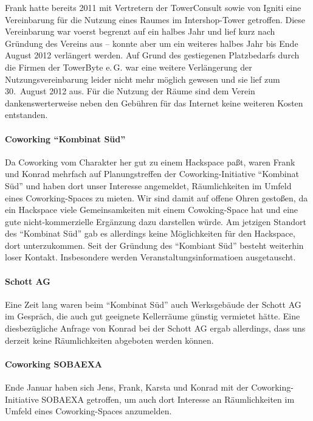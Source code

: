 \documentclass[10pt,DIV16]{scrartcl}
\begin{document}
Frank hatte bereits 2011 mit Vertretern der TowerConsult sowie
von Igniti eine Vereinbarung für die Nutzung eines Raumes im 
Intershop-Tower getroffen. Diese Vereinbarung war voerst begrenzt 
auf ein halbes Jahr und lief kurz nach Gründung des Vereins aus -- 
konnte aber um ein weiteres halbes Jahr bis Ende August 2012 
verlängert werden. Auf Grund des gestiegenen Platzbedarfs durch die
Firmen der TowerByte e.\,G. war eine weitere Verlängerung der
Nutzungsvereinbarung leider nicht mehr möglich gewesen und sie
lief zum 30.~August 2012 aus. Für die Nutzung der Räume sind dem
Verein dankenswerterweise neben den Gebühren für das Internet keine
weiteren Kosten entstanden.

\paragraph{Coworking ``Kombinat Süd''}

Da Coworking vom Charakter her gut zu einem Hackspace paßt, waren 
Frank und Konrad mehrfach auf Planungstreffen der 
Coworking-Initiative "`Kombinat Süd"' und haben dort unser Interesse 
angemeldet, Räumlichkeiten im Umfeld eines Coworking-Spaces zu 
mieten.  Wir sind damit auf offene Ohren gestoßen, da ein Hackspace 
viele Gemeinsamkeiten mit einem Cowoking-Space hat und eine gute 
nicht-kommerzielle Ergänzung dazu darstellen würde.  Am jetzigen 
Standort des "`Kombinat Süd"' gab es allerdings keine Möglichkeiten 
für den Hackspace, dort unterzukommen. Seit der Gründung des 
"`Kombiant Süd"' besteht weiterhin loser Kontakt.  Insbesondere
werden Veranstaltungsinformatioen ausgetauscht.

\paragraph{Schott AG}

Eine Zeit lang waren beim "`Kombinat Süd"' auch Werksgebäude der Schott AG im
Gespräch, die auch gut geeignete Kellerräume günstig vermietet hätte.  Eine
diesbezügliche Anfrage von Konrad bei der Schott AG ergab allerdings, dass uns
derzeit keine Räumlichkeiten abgeboten werden können.

\paragraph{Coworking SOBAEXA}

Ende Januar haben sich Jens, Frank, Karsta und Konrad mit der 
Coworking-Initiative SOBAEXA getroffen, um auch dort Interesse an 
Räumlichkeiten im Umfeld eines Coworking-Spaces anzumelden.
\end{document}
